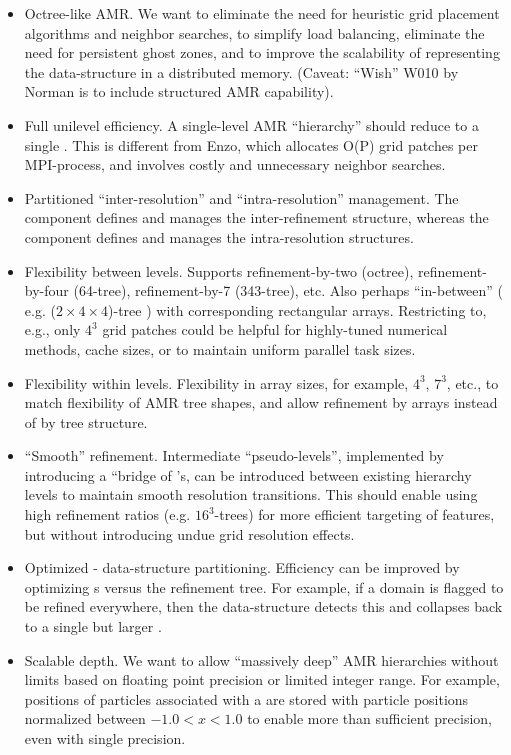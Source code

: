\begin{itemize}
%
    \item Octree-like AMR. We want to eliminate the need for heuristic
      grid placement algorithms and neighbor searches, to simplify
      load balancing, eliminate the need for persistent ghost zones,
      and to improve the scalability of representing the
      data-structure in a distributed memory. (Caveat: ``Wish'' W010
      by Norman is to include structured AMR capability).
%
    \item Full unilevel efficiency. A single-level AMR ``hierarchy''
      should reduce to a single . This is different from Enzo,
      which allocates O(P) grid patches per MPI-process, and involves
      costly and unnecessary neighbor searches.
%
    \item Partitioned ``inter-resolution'' and ``intra-resolution''
      management. The  component defines and manages the
      inter-refinement structure, whereas the  component
      defines and manages the intra-resolution structures.
%
    \item Flexibility between levels. Supports refinement-by-two
      (octree), refinement-by-four (64-tree), refinement-by-7
      (343-tree), etc. Also perhaps ``in-between'' ( e.g. ($2 \times 4
      \times 4$)-tree ) with corresponding rectangular
      arrays. Restricting to, e.g., only $4^3$ grid patches could be
      helpful for highly-tuned numerical methods, cache sizes, or to
      maintain uniform parallel task sizes.
%
    \item Flexibility within levels. Flexibility in array sizes, for
      example, $4^3$, $7^3$, etc., to match flexibility of AMR tree
      shapes, and allow refinement by  arrays instead of
      by  tree structure.
%
    \item ``Smooth'' refinement. Intermediate ``pseudo-levels'',
      implemented by introducing a ``bridge of 's, can be
      introduced between existing hierarchy levels to maintain smooth
      resolution transitions. This should enable using high refinement
      ratios (e.g. $16^3$-trees) for more efficient targeting of
      features, but without introducing undue grid resolution effects.
%
    \item Optimized  -  data-structure
      partitioning. Efficiency can be improved by optimizing
      s versus the  refinement tree. For
      example, if a domain is flagged to be refined everywhere, then
      the  data-structure detects this and collapses back to
      a single but larger .
%
    \item Scalable depth. We want to allow ``massively deep''
      AMR hierarchies without limits based on floating point
      precision or limited integer range.  For example, positions of
      particles associated with a   are stored
      with particle positions normalized between $-1.0 < x < 1.0$ to
      enable more than sufficient precision, even with single precision.
\end{itemize}

